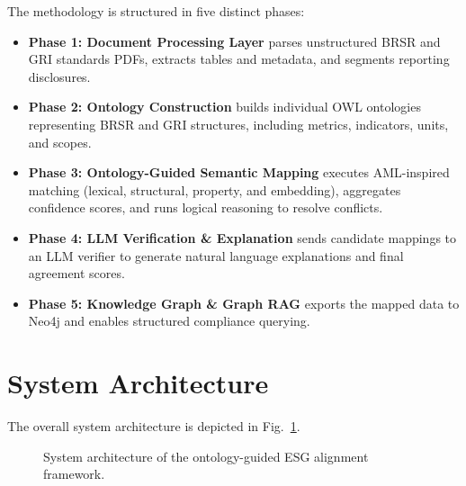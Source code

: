 \documentclass[journal,compsoc]{IEEEtran}
\begin{document}
\begin{itemize}
The methodology is structured in five distinct phases:
\begin{itemize}
    \item \textbf{Phase 1: Document Processing Layer} parses unstructured BRSR and GRI standards PDFs, extracts tables and metadata, and segments reporting disclosures.
    \item \textbf{Phase 2: Ontology Construction} builds individual OWL ontologies representing BRSR and GRI structures, including metrics, indicators, units, and scopes.
    \item \textbf{Phase 3: Ontology-Guided Semantic Mapping} executes AML-inspired matching (lexical, structural, property, and embedding), aggregates confidence scores, and runs logical reasoning to resolve conflicts.
    \item \textbf{Phase 4: LLM Verification \& Explanation} sends candidate mappings to an LLM verifier to generate natural language explanations and final agreement scores.
    \item \textbf{Phase 5: Knowledge Graph \& Graph RAG} exports the mapped data to Neo4j and enables structured compliance querying.
\end{itemize}

\section{System Architecture}
The overall system architecture is depicted in Fig.~\ref{fig:framework}.

\begin{figure}[t]
\centering
{}
\caption{System architecture of the ontology-guided ESG alignment framework.}
\label{fig:framework}
\end{figure}


\end{itemize}
\end{document}
